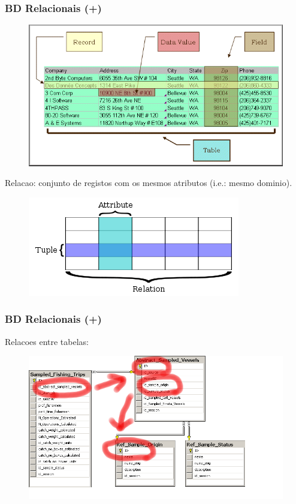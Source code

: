 \documentclass[hyperref={pdfpagelabels=true}]{beamer}
\begin{document}
\begin{frame}
\frametitle{BD Relacionais (+)}
  \begin{figure}
  \includegraphics[scale=0.3]{table.png}
  \end{figure}
Relacao: conjunto de registos com os mesmos atributos (i.e.: mesmo dominio).\\
  \begin{figure}
  \includegraphics[scale=0.4]{350px-Relational_database_terms.png}
  \end{figure}
\end{frame}

\begin{frame}
\frametitle{BD Relacionais (+)}
Relacoes entre tabelas:\\
\begin{figure}
\includegraphics[scale=0.5]{sample_status_originb}
\end{figure}
\end{frame}
\end{document}
